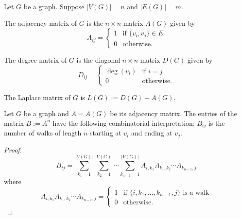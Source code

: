 Let $G$ be a graph. Suppose $|V(G)|=n$ and $|E(G)|=m$. 
\begin{definition}
The adjacency matrix of $G$ is the $n\times n$ matrix $A(G)$ given by
$$
A_{ij}=\begin{cases}
1 & \text{if }\{ v_{i},v_{j} \}\in E \\
0 & \text{otherwise}.
\end{cases}
$$
\end{definition}
\begin{definition}
The degree matrix of $G$ is the diagonal $n\times n$ matrix $D(G)$ given by
$$
D_{ij}=\begin{cases}
\deg(v_{i}) & \text{if }i=j \\
0 & \text{otherwise}.
\end{cases}
$$
\end{definition}
\begin{definition}
The Laplace matrix of $G$ is $L(G):=D(G)-A(G)$.
\end{definition}
\begin{lemma}
Let $G$ be a graph and $A=A(G)$ be its adjacency matrix. The entries of the matrix $B:=A^{n}$ have the following combinatorial interpretation: $B_{ij}$ is the number of walks of length $n$ starting at $v_{i}$ and ending at $v_{j}$.
\end{lemma}
\begin{proof}
$$
B_{ij}=\sum _{k_{1}=1}^{|V(G)|}\sum_{k_{2}=1}^{|V(G)|} \cdots \sum _{k_{n-1}=1}^{|V(G)|} A_{i,k_{1}}A_{k_{1},k_{2}}\cdots A_{k_{n-1},j}
$$
where
$$
A_{i,k_{1}}A_{k_{1},k_{2}}\cdots A_{k_{n-1},j}=\begin{cases}
1 & \text{if }\{ i,k_{1},\dots,k_{n-1},j \} \text{ is a walk} \\
0 & \text{otherwise.}
\end{cases}
$$
\end{proof}

